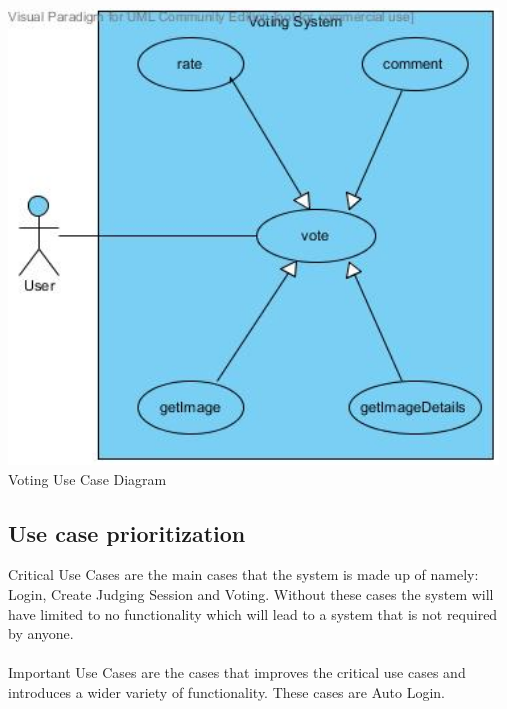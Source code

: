 \documentclass[10pt,a4paper]{article}
\begin{document}
\begin{center}
\advance\leftskip-1.3cm
\includegraphics[width=130mm]{Pictures/Vote.jpg} 
Voting Use Case Diagram 
\end{center}

\subsection{Use case prioritization}
Critical Use Cases are the main cases that the system is made up of namely: Login, Create Judging Session and Voting. Without these cases the system will have limited to no functionality which will lead to a system that is not required by anyone.
\\ \\
Important Use Cases are the cases that improves the critical use cases and introduces a wider variety of functionality. These cases are Auto Login.

\end{document}
